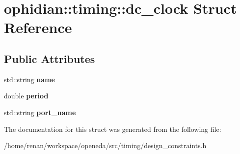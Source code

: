 \hypertarget{structophidian_1_1timing_1_1dc__clock}{\section{ophidian\-:\-:timing\-:\-:dc\-\_\-clock Struct Reference}
\label{structophidian_1_1timing_1_1dc__clock}
}
\subsection*{Public Attributes}
\begin{DoxyCompactItemize}
\item 
\hypertarget{structophidian_1_1timing_1_1dc__clock_a2933fc825230693d445c4893e22c87bc}{std\-::string {\bfseries name}}\label{structophidian_1_1timing_1_1dc__clock_a2933fc825230693d445c4893e22c87bc}

\item 
\hypertarget{structophidian_1_1timing_1_1dc__clock_a7c381c2cc2bed0b2637022776538583c}{double {\bfseries period}}\label{structophidian_1_1timing_1_1dc__clock_a7c381c2cc2bed0b2637022776538583c}

\item 
\hypertarget{structophidian_1_1timing_1_1dc__clock_a1677647274c333dbb9f3e12c08c0d207}{std\-::string {\bfseries port\-\_\-name}}\label{structophidian_1_1timing_1_1dc__clock_a1677647274c333dbb9f3e12c08c0d207}

\end{DoxyCompactItemize}


The documentation for this struct was generated from the following file\-:\begin{DoxyCompactItemize}
\item 
/home/renan/workspace/openeda/src/timing/design\-\_\-constraints.\-h\end{DoxyCompactItemize}
